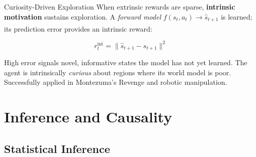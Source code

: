 \begin{v3topic}{Curiosity-Driven Exploration}
    When extrinsic rewards are sparse, \textbf{intrinsic motivation} sustains
    exploration. A \emph{forward model} $f(s_t, a_t) \to \hat{s}_{t+1}$ is
    learned; its prediction error provides an intrinsic
    reward:\textsuperscript{\cite[][Ch.~2]{suttonReinforcementLearningIntroduction2018}}

    \begin{equation}
        r^{\mathrm{int}}_t = \bigl\lVert\hat{s}_{t+1} - s_{t+1}\bigr\rVert^2
    \end{equation}

    High error signals novel, informative states the model has not yet learned.
    The agent is intrinsically \emph{curious} about regions where its world
    model is poor. Successfully applied in Montezuma’s Revenge and robotic
    manipulation.

\end{v3topic}


    \section{Inference and Causality}

    \subsection{Statistical Inference}


